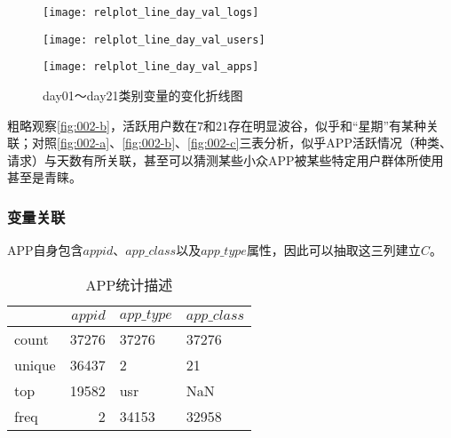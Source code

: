 \documentclass[withoutpreface,bwprint]{cumcmthesis}
\begin{document}
\begin{figure}[!htbp]
    \centering
    \begin{minipage}[c]{0.3\textwidth}
        \centering
        \texttt{[image: relplot\_line\_day\_val\_logs]}
        \label{fig:002-a}
    \end{minipage}
    \begin{minipage}[c]{0.3\textwidth}
        \centering
        \texttt{[image: relplot\_line\_day\_val\_users]}
        \label{fig:002-b}
    \end{minipage}
    \begin{minipage}[c]{0.3\textwidth}
        \centering
        \texttt{[image: relplot\_line\_day\_val\_apps]}
        \label{fig:002-c}
    \end{minipage}
    \caption{day01～day21类别变量的变化折线图}
    \label{fig:002}
\end{figure}

粗略观察\cref{fig:002-b}，活跃用户数在$7$和$21$存在明显波谷，似乎和“星期”有某种关联；对照\cref{fig:002-a}、\cref{fig:002-b}、\cref{fig:002-c}三表分析，似乎APP活跃情况（种类、请求）与天数有所关联，甚至可以猜测某些小众APP被某些特定用户群体所使用甚至是青睐。

\subsubsection{变量关联}

APP自身包含$appid$、$app\_class$以及$app\_type$属性，因此可以抽取这三列建立$C$。

\begin{table}[!htbp]
    \caption{APP统计描述}\label{tab:003} \centering
    \begin{tabular}{lrll}
        \toprule
               & $appid$ & $app\_type$ & $app\_class$ \\
        \midrule
        count  & 37276   & 37276       & 37276        \\
        unique & 36437   & 2           & 21           \\
        top    & 19582   & usr         & NaN          \\
        freq   & 2       & 34153       & 32958        \\
        \bottomrule
    \end{tabular}
\end{table}
\end{document}
